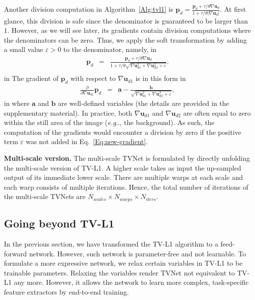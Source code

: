 \documentclass[10pt,twocolumn,letterpaper]{article}
\makeatletter
\DeclareRobustCommand\onedot{\futurelet\@let@token\@onedot}
\def\@onedot{\ifx\@let@token.\else.\null\fi\xspace}
\def\eg{\emph{e.g}\onedot} \def\Eg{\emph{E.g}\onedot}
\def\Vec#1{{\boldsymbol{#1}}}
\makeatother
\begin{document}
Another division computation in Algorithm~\ref{Alg:tvl1} is
$
\label{Eq:p}
\Vec{p}_d=\frac{\Vec{p}_d+\tau/\theta \nabla\Vec{u}_d}{1+\tau/\theta|\nabla\Vec{u}_d|}.
$
At first glance, this division is safe since the denominator is guaranteed to be larger than $1$.
However,
as we will see later, its gradients contain division computations where the denominators can be zero.
Thus, we apply the soft transformation by adding a small value $\varepsilon>0$ to the denominator, namely,
 in
\begin{eqnarray}
\label{Eq:new-p}
\nonumber \Vec{p}_d &=& \frac{\Vec{p}_d+\tau/\theta \nabla\Vec{u}_d}{1+\tau/\theta\sqrt{\nabla\Vec{u}_{d1}^2+\nabla\Vec{u}_{d2}^2+\varepsilon}}.\\
\end{eqnarray}
 in \noindent
The gradient of $\Vec{p}_d$ with respect to $\nabla\Vec{u}_{d1}$ is in this form
 in
\begin{eqnarray}
\label{Eq:new-gradient}
\frac{\partial}{\partial \nabla\Vec{u}_{d1}}\Vec{p}_d &=& \Vec{a}-\frac{\Vec{b}}{\sqrt{\nabla\Vec{u}_{d1}^2+\nabla\Vec{u}_{d2}^2+\varepsilon}},
\end{eqnarray}
 in \noindent
where $\Vec{a}$ and $\Vec{b}$ are well-defined variables (the details are provided in the supplementary material). In practice, both $\nabla\Vec{u}_{d1}$ and $\nabla\Vec{u}_{d2}$ are often equal to zero within the still area of the image (\eg, the background). As such, the computation of the gradients would encounter a division by zero if the positive term $\varepsilon$ was not added in Eq.~\eqref{Eq:new-gradient}. 

\textbf{Multi-scale version.} The multi-scale TVNet is formulated by directly unfolding the multi-scale version of TV-L1.
A higher scale takes as input the up-sampled output of its immediate lower scale.
There are multiple warps at each scale and each warp consists of multiple iterations.
Hence, the total number of iterations of the multi-scale TVNets are $N_{scales}\times N_{warps}\times N_{iters}$.
\subsection{Going beyond TV-L1}
\label{Sec:variable-relaxation}

In the previous section, we have transformed the TV-L1 algorithm to a feed-forward network. However, such network is parameter-free and not learnable. To formulate a more expressive network, we relax certain variables in TV-L1 to be trainable parameters. Relaxing the variables render TVNet not equivalent to TV-L1 any more. However, it allows the network to learn more complex, task-specific feature extractors by end-to-end training.
\end{document}

